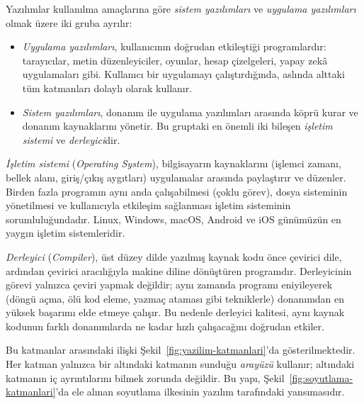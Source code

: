 Yazılımlar kullanılma amaçlarına göre \emph{sistem yazılımları} ve \emph{uygulama yazılımları} olmak üzere iki gruba ayrılır:

\begin{itemize}[nosep, leftmargin=*]
    \item \emph{Uygulama yazılımları}, kullanıcının doğrudan etkileştiği programlardır: tarayıcılar, metin düzenleyiciler, oyunlar, hesap çizelgeleri, yapay zekâ uygulamaları gibi. Kullanıcı bir uygulamayı çalıştırdığında, aslında alttaki tüm katmanları dolaylı olarak kullanır.
    \item \emph{Sistem yazılımları}, donanım ile uygulama yazılımları arasında köprü kurar ve donanım kaynaklarını yönetir. Bu gruptaki en önemli iki bileşen \emph{işletim sistemi} ve \emph{derleyici}dir.
\end{itemize}

\emph{İşletim sistemi} (\emph{Operating System}), bilgisayarın kaynaklarını (işlemci zamanı, bellek alanı, giriş/çıkış aygıtları) uygulamalar arasında paylaştırır ve düzenler. Birden fazla programın aynı anda çalışabilmesi (çoklu görev), dosya sisteminin yönetilmesi ve kullanıcıyla etkileşim sağlanması işletim sisteminin sorumluluğundadır. Linux, Windows, macOS, Android ve iOS günümüzün en yaygın işletim sistemleridir.

\emph{Derleyici} (\emph{Compiler}), üst düzey dilde yazılmış kaynak kodu önce çevirici dile, ardından çevirici aracılığıyla makine diline dönüştüren programdır. Derleyicinin görevi yalnızca çeviri yapmak değildir; aynı zamanda programı eniyileyerek (döngü açma, ölü kod eleme, yazmaç ataması gibi tekniklerle) donanımdan en yüksek başarımı elde etmeye çalışır. Bu nedenle derleyici kalitesi, aynı kaynak kodunun farklı donanımlarda ne kadar hızlı çalışacağını doğrudan etkiler.

Bu katmanlar arasındaki ilişki Şekil~\ref{fig:yazilim-katmanlari}'da gösterilmektedir. Her katman yalnızca bir altındaki katmanın sunduğu \emph{arayüzü} kullanır; altındaki katmanın iç ayrıntılarını bilmek zorunda değildir. Bu yapı, Şekil~\ref{fig:soyutlama-katmanlari}'da ele alınan soyutlama ilkesinin yazılım tarafındaki yansımasıdır.

